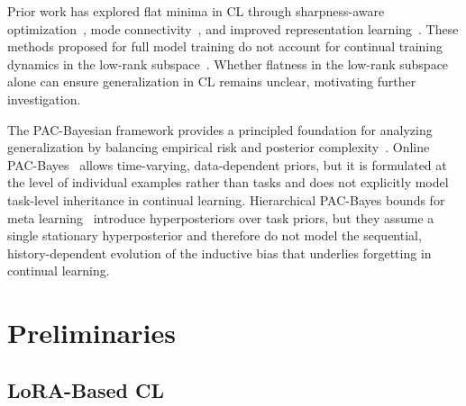 \documentclass{article}
\newcommand{\minisection}[1]{\vspace{0.0in} \noindent {\bf #1}}
\theoremstyle{plain}
\theoremstyle{definition}
\theoremstyle{remark}
\begin{document}
\minisection{Flat Minima.}
Prior work has explored flat minima in CL through sharpness-aware optimization~\cite{pmlr-v151-bisla22a,Zhang_GAM,NEURIPS2024_C-Flat,yangRevisitingFlatnessAwareOptimization2025,chen2026sharpnessflatnessdecompositionframework}, mode connectivity~\cite{izmailov2019averagingweightsleadswider,mirzadeh2020linearmodeconnectivitymultitask}, and improved representation learning~\cite{hu2022doesselfsupervisedpretrainingperform,ramasesh2022effect}.
These methods proposed for full model training do not account for continual training dynamics in the low-rank subspace~\cite{yangRevisitingFlatnessAwareOptimization2025}. Whether flatness in the low-rank subspace alone can ensure generalization in CL remains unclear, motivating further investigation.


\minisection{PAC-Bayesian Theory.}
The PAC-Bayesian framework provides a principled foundation for analyzing generalization by balancing empirical risk and posterior complexity~\cite{mcallesterPACBayesianModelAveraging1999,mcallesterPACBayesianStochasticModel2003,pentinaPACBayesianBoundLifelong2014,germainPACBayesianTheoryMeets2016,lotfiPACBayesCompressionBounds2022}.
Online PAC-Bayes~\citep{NEURIPS2022_onlineBayes,NEURIPS2024_xinrui} allows time-varying, data-dependent priors, but it is formulated at the level of individual examples rather than tasks and does not explicitly model task-level inheritance in continual learning.
Hierarchical PAC-Bayes bounds for meta learning~\citep{pentinaPACBayesianBoundLifelong2014,JMLR:v24:22-1254} introduce hyperposteriors over task priors, but they assume a single stationary hyperposterior and therefore do not model the sequential, history-dependent evolution of the inductive bias that underlies forgetting in continual learning.




\section{Preliminaries}

\subsection{LoRA-Based CL}
\label{sec:pecl-setup}
\end{document}
